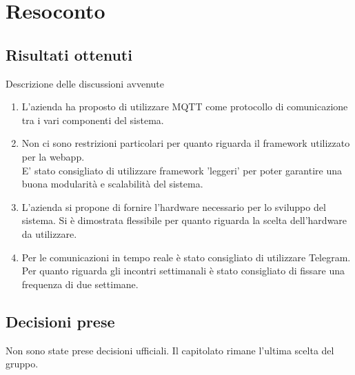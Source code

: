 \section{Resoconto}

\subsection{Risultati ottenuti}
Descrizione delle discussioni avvenute
\begin{enumerate}
    \item L'azienda ha proposto di utilizzare MQTT come protocollo di comunicazione tra i vari componenti del sistema. 
    \item Non ci sono restrizioni particolari per quanto riguarda il framework utilizzato per la webapp. \\ E' stato consigliato di utilizzare framework 'leggeri' per poter garantire una buona modularità e scalabilità del sistema.
    \item L'azienda si propone di fornire l'hardware necessario per lo sviluppo del sistema. Si è dimostrata flessibile per quanto riguarda la scelta dell'hardware da utilizzare.
    \item Per le comunicazioni in tempo reale  è stato consigliato di utilizzare Telegram. \\ Per quanto riguarda gli incontri settimanali è stato consigliato di fissare una frequenza di due settimane.
\end{enumerate}

\subsection{Decisioni prese}
Non sono state prese decisioni ufficiali. Il capitolato rimane l'ultima scelta del gruppo.
